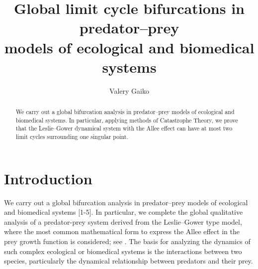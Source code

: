 \documentclass[12pt]{llncs}
\begin{document}
\fi

\title{Global limit cycle bifurcations in predator--prey\\ models of ecological and biomedical systems}

\author{Valery Gaiko
}

\maketitle

\begin{abstract}
We carry out a global bifurcation analysis in predator--prey models of ecological and biomedical systems. In particular, applying methods of Catastrophe Theory, we prove that the Leslie--Gower
dynamical system with the Allee effect can have at most two limit cycles surrounding one singular
point.

\end{abstract}

\section{Introduction}

We carry out a global bifurcation analysis in predator--prey models of ecological and biomedical
systems [1-5]. In particular, we complete the global qualitative
analysis of a predator-prey system derived from the Leslie--Gower type model, where the most
common mathematical form to express the Allee effect in the prey growth function is considered;
see \cite{gaiko5}. The basis for analyzing the dynamics of such complex ecological or biomedical
systems is the interactions between two species, particularly the dynamical relationship between
predators and their prey. 
\end{document}
